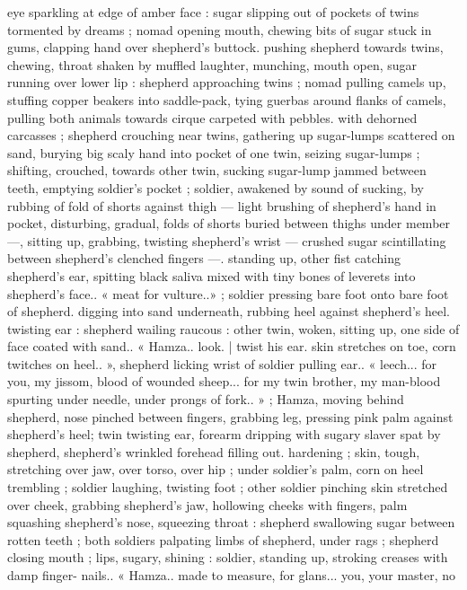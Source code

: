 eye sparkling at edge of amber face : sugar slipping out of pockets
of twins tormented by dreams ; nomad opening mouth, chewing bits
of sugar stuck in gums, clapping hand over shepherd's buttock.
pushing shepherd towards twins, chewing, throat shaken by muffled
laughter, munching, mouth open, sugar running over lower lip :
shepherd approaching twins ; nomad pulling camels up, stuffing
copper beakers into saddle-pack, tying guerbas around flanks of
camels, pulling both animals towards cirque carpeted with pebbles.
with dehorned carcasses ; shepherd crouching near twins, gathering
up sugar-lumps scattered on sand, burying big scaly hand into
pocket of one twin, seizing sugar-lumps ; shifting, crouched, towards
other twin, sucking sugar-lump jammed between teeth, emptying
soldier's pocket ; soldier, awakened by sound of sucking, by rubbing
of fold of shorts against thigh --- light brushing of shepherd's hand
in pocket, disturbing, gradual, folds of shorts buried between thighs
under member ---, sitting up, grabbing, twisting shepherd's wrist ---
crushed sugar scintillating between shepherd's clenched fingers ---.
standing up, other fist catching shepherd's ear, spitting black saliva
mixed with tiny bones of leverets into shepherd's face.. « meat for
vulture..» ; soldier pressing bare foot onto bare foot of shepherd.
digging into sand underneath, rubbing heel against shepherd's heel.
twisting ear : shepherd wailing raucous : other twin, woken, sitting
up, one side of face coated with sand.. « Hamza.. look. | twist his ear.
skin stretches on toe, corn twitches on heel.. », shepherd licking wrist
of soldier pulling ear.. « leech... for you, my jissom, blood of wounded
sheep... for my twin brother, my man-blood spurting under needle,
under prongs of fork.. » ; Hamza, moving behind shepherd, nose
pinched between fingers, grabbing leg, pressing pink palm against
shepherd's heel; twin twisting ear, forearm dripping with sugary
slaver spat by shepherd, shepherd's wrinkled forehead filling out.
hardening ; skin, tough, stretching over jaw, over torso, over hip ;
under soldier's palm, corn on heel trembling ; soldier laughing,
twisting foot ; other soldier pinching skin stretched over cheek,
grabbing shepherd's jaw, hollowing cheeks with fingers, palm
squashing shepherd's nose, squeezing throat : shepherd swallowing
sugar between rotten teeth ; both soldiers palpating limbs of
shepherd, under rags ; shepherd closing mouth ; lips, sugary,
shining : soldier, standing up, stroking creases with damp finger-
nails.. « Hamza.. made to measure, for glans... you, your master, no
